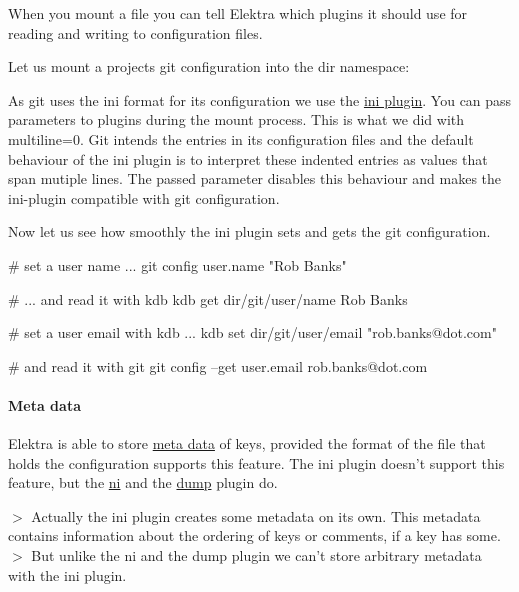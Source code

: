 When you mount a file you can tell Elektra which plugins it should use for reading and writing to configuration files.

Let us mount a projects git configuration into the dir namespace\+: 


As git uses the ini format for its configuration we use the \hyperlink{md_src_plugins_ini_README_src_plugins_ini_README_md}{ini plugin}. You can pass parameters to plugins during the mount process. This is what we did with {\ttfamily multiline=0}. Git intends the entries in its configuration files and the default behaviour of the ini plugin is to interpret these indented entries as values that span mutiple lines. The passed parameter disables this behaviour and makes the ini-\/plugin compatible with git configuration.

Now let us see how smoothly the ini plugin sets and gets the git configuration. \begin{DoxyVerb}# set a user name ...
git config user.name "Rob Banks"

# ... and read it with kdb
kdb get dir/git/user/name
Rob Banks

# set a user email with kdb ...
kdb set dir/git/user/email "rob.banks@dot.com"

# and read it with git
git config --get user.email
rob.banks@dot.com
\end{DoxyVerb}


\paragraph*{Meta data}

Elektra is able to store \hyperlink{md_doc_help_elektra-metadata_doc_help_elektra-metadata_md}{meta data} of keys, provided the format of the file that holds the configuration supports this feature. The ini plugin doesn't support this feature, but the \hyperlink{md_src_plugins_ni_README_src_plugins_ni_README_md}{ni} and the \hyperlink{md_src_plugins_dump_README_src_plugins_dump_README_md}{dump} plugin do.

$>$ Actually the ini plugin creates some metadata on its own. This metadata contains information about the ordering of keys or comments, if a key has some. $>$ But unlike the ni and the dump plugin we can't store arbitrary metadata with the ini plugin.

